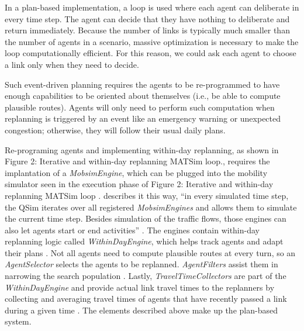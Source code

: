 \documentclass[
  letterpaper,
  authoryear]{elsarticle}
\begin{document}
In a plan-based implementation, a loop is used where each agent can
deliberate in every time step. The agent can decide that they have
nothing to deliberate and return immediately. Because the number of
links is typically much smaller than the number of agents in a scenario,
massive optimization is necessary to make the loop computationally
efficient. For this reason, we could ask each agent to choose a link
only when they need to decide.

Such event-driven planning requires the agents to be re-programmed to
have enough capabilities to be oriented about themselves (i.e., be able
to compute plausible routes). Agents will only need to perform such
computation when replanning is triggered by an event like an emergency
warning or unexpected congestion; otherwise, they will follow their
usual daily plans.

Re-programing agents and implementing within-day replanning, as shown in
Figure 2: Iterative and within-day replanning MATSim loop., requires the
implantation of a \emph{MobsimEngine}, which can be plugged into the
mobility simulator seen in the execution phase of Figure 2: Iterative
and within-day replanning MATSim loop \citep{axhausen2016}.
\citet{dobler2016} describes it this way, ``in every simulated time
step, the QSim iterates over all registered \emph{MobsimEngines} and
allows them to simulate the current time step. Besides simulation of the
traffic flows, those engines can also let agents start or end
activities'' \citep[ p.~193]{dobler2016}. The engines contain within-day
replanning logic called \emph{WithinDayEngine}, which helps track agents
and adapt their plans \citep{dobler2016}. Not all agents need to compute
plausible routes at every turn, so an \emph{AgentSelector} selects the
agents to be replanned. \emph{AgentFilters} assist them in narrowing the
search population \citep{dobler2016}. Lastly,
\emph{TravelTimeCollectors} are part of the \emph{WithinDayEngine} and
provide actual link travel times to the replanners by collecting and
averaging travel times of agents that have recently passed a link during
a given time \citep{dobler2016}. The elements described above make up
the plan-based system.
\end{document}
